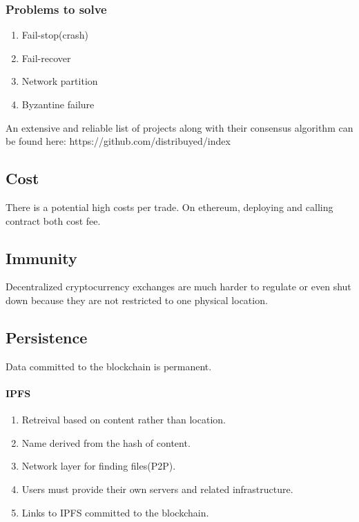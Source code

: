 \documentclass[]{article}
\begin{document}
	\subsubsection{Problems to solve}
	\begin{enumerate} 
		\item Fail-stop(crash)
		\item Fail-recover
		\item Network partition
		\item Byzantine failure	
	\end{enumerate}

	 An extensive and reliable list of projects along with their consensus algorithm can be found here:
	 https://github.com/distribuyed/index
	 

	 \subsection{Cost}
	 There is a potential high costs per trade.
	 On ethereum, deploying and calling contract both cost fee. 
	 
	\subsection{Immunity}
	 Decentralized cryptocurrency exchanges are much harder 
	 to regulate or even shut down because they are not restricted 
	 to one physical location.
	\subsection{Persistence}  
	Data committed to the blockchain is permanent.\\
	\paragraph{IPFS\\}
	\begin{enumerate}
	\item Retreival based on content rather than location. \\
	\item Name derived from the hash of content.\\
	\item Network layer for finding files(P2P).\\
	\item Users must provide their own servers and related infrastructure.\\
	\item Links to IPFS committed to the blockchain.\\
	\end{enumerate}
\end{document}
